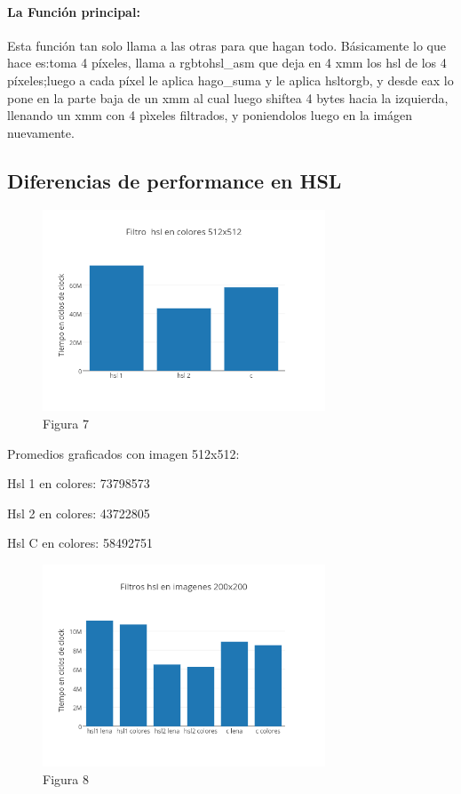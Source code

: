 \documentclass[a4paper]{article}
\begin{document}
\paragraph*{La Función principal:}

Esta función tan solo llama a las otras para que hagan todo. Básicamente lo que hace es:toma 4 píxeles, llama a rgbtohsl_asm que deja en 4 xmm los hsl de los 4 píxeles;luego a cada píxel le aplica hago_suma y le aplica hsltorgb, y desde eax lo pone en la parte baja de un xmm al cual luego shiftea 4 bytes hacia la izquierda, llenando un xmm con 4 pìxeles filtrados, y poniendolos luego en la imágen nuevamente.



\subsection{Diferencias de performance en HSL}

\begin{figure}[h]
  \centering
    \includegraphics[width=0.75\textwidth]{imagenes/FiltroHslEnColores512x512.png}
  \caption{Figura 7}
  \label{fig:graficohsl1}
\end{figure}
 \FloatBarrier

Promedios graficados con imagen 512x512:

Hsl 1 en colores: 73798573

Hsl 2 en colores: 43722805

Hsl C en colores: 58492751

\begin{figure}[h]
  \centering
    \includegraphics[width=0.75\textwidth]{imagenes/FiltrosHslEnImagenes200x200.png}
  \caption{Figura 8}
  \label{fig:graficohsl2}
\end{figure}
 \FloatBarrier
\end{document}
